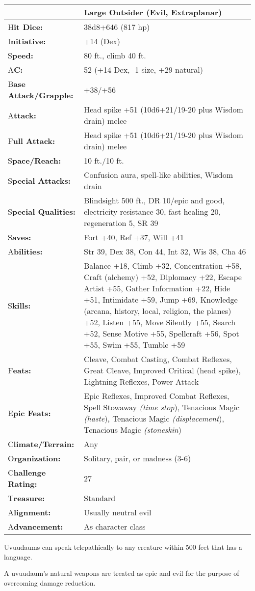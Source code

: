 \documentclass{article}
\begin{document}
{\begin{tabular}{|>{\raggedright}p{66pt}|>{\raggedright}p{259pt}|}
\hline
  & Large Outsider (Evil, Extraplanar) \tabularnewline
\hline
H\textbf{it Dice:} & 38d8+646 (817 hp) \tabularnewline
\hline
I\textbf{nitiative:} & +14 (Dex) \tabularnewline
\hline
S\textbf{peed:} & 80 ft., climb 40 ft. \tabularnewline
\hline
A\textbf{C:} & 52 (+14 Dex, -1 size, +29 natural) \tabularnewline
\hline
B\textbf{ase Attack/Grapple:} & +38/+56\tabularnewline
\hline
A\textbf{ttack:} & Head spike +51 (10d6+21/19-20 plus Wisdom drain) melee\tabularnewline
\hline
F\textbf{ull Attack:} & Head spike +51 (10d6+21/19-20 plus Wisdom drain) melee\tabularnewline
\hline
S\textbf{pace/Reach:} & 10 ft./10 ft. \tabularnewline
\hline
S\textbf{pecial Attacks:} & Confusion aura, spell-like abilities, Wisdom drain 
\tabularnewline
\hline
S\textbf{pecial Qualities:} & Blindsight 500 ft., DR 10/epic and good, electricity 
resistance 30, fast healing 20, regeneration 5, SR 39 \tabularnewline
\hline
S\textbf{aves:} & Fort +40, Ref +37, Will +41 \tabularnewline
\hline
A\textbf{bilities:} & Str 39, Dex 38, Con 44, Int 32, Wis 38, Cha 46 \tabularnewline
\hline
S\textbf{kills:} & Balance +18, Climb +32, Concentration +58, Craft (alchemy) +52, 
Diplomacy +22, Escape Artist +55, Gather Information +22, Hide +51, Intimidate 
+59, Jump +69, Knowledge (arcana, history, local, religion, the planes) +52, Listen 
+55, Move Silently +55, Search +52, Sense Motive +55, Spellcraft +56, Spot +55, 
Swim +55, Tumble +59\tabularnewline
\hline
F\textbf{eats:} & Cleave, Combat Casting, Combat Reflexes, Great Cleave, Improved 
Critical (head spike), Lightning Reflexes, Power Attack \tabularnewline
\hline
E\textbf{pic Feats:} & Epic Reflexes, Improved Combat Reflexes, Spell Stowaway 
\textit{(time stop}), Tenacious Magic \textit{(haste}), Tenacious Magic \textit{(displacement}), 
Tenacious Magic \textit{(stoneskin}) \tabularnewline
\hline
C\textbf{limate/Terrain:} & Any \tabularnewline
\hline
O\textbf{rganization:} & Solitary, pair, or madness (3-6) \tabularnewline
\hline
C\textbf{hallenge Rating:} & 27 \tabularnewline
\hline
T\textbf{reasure:} & Standard \tabularnewline
\hline
A\textbf{lignment:} & Usually neutral evil \tabularnewline
\hline
A\textbf{dvancement:} & As character class \tabularnewline
\hline
\end{tabular}

Uvuudaums can speak telepathically to any creature within 500 feet that has a language. 

A uvuudaum's natural weapons are treated as epic and evil for the purpose of overcoming 
damage reduction.

}
\end{document}
